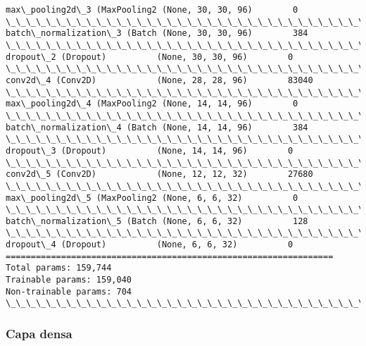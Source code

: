 \documentclass[11pt]{uc3mpracticas}
\begin{document}
\begin{Verbatim}[commandchars=\\\{\}]
max\_pooling2d\_3 (MaxPooling2 (None, 30, 30, 96)        0
\_\_\_\_\_\_\_\_\_\_\_\_\_\_\_\_\_\_\_\_\_\_\_\_\_\_\_\_\_\_\_\_\_\_\_\_\_\_\_\_\_\_\_\_\_\_\_\_\_\_\_\_\_\_\_\_\_\_\_\_\_\_\_\_\_
batch\_normalization\_3 (Batch (None, 30, 30, 96)        384
\_\_\_\_\_\_\_\_\_\_\_\_\_\_\_\_\_\_\_\_\_\_\_\_\_\_\_\_\_\_\_\_\_\_\_\_\_\_\_\_\_\_\_\_\_\_\_\_\_\_\_\_\_\_\_\_\_\_\_\_\_\_\_\_\_
dropout\_2 (Dropout)          (None, 30, 30, 96)        0
\_\_\_\_\_\_\_\_\_\_\_\_\_\_\_\_\_\_\_\_\_\_\_\_\_\_\_\_\_\_\_\_\_\_\_\_\_\_\_\_\_\_\_\_\_\_\_\_\_\_\_\_\_\_\_\_\_\_\_\_\_\_\_\_\_
conv2d\_4 (Conv2D)            (None, 28, 28, 96)        83040
\_\_\_\_\_\_\_\_\_\_\_\_\_\_\_\_\_\_\_\_\_\_\_\_\_\_\_\_\_\_\_\_\_\_\_\_\_\_\_\_\_\_\_\_\_\_\_\_\_\_\_\_\_\_\_\_\_\_\_\_\_\_\_\_\_
max\_pooling2d\_4 (MaxPooling2 (None, 14, 14, 96)        0
\_\_\_\_\_\_\_\_\_\_\_\_\_\_\_\_\_\_\_\_\_\_\_\_\_\_\_\_\_\_\_\_\_\_\_\_\_\_\_\_\_\_\_\_\_\_\_\_\_\_\_\_\_\_\_\_\_\_\_\_\_\_\_\_\_
batch\_normalization\_4 (Batch (None, 14, 14, 96)        384
\_\_\_\_\_\_\_\_\_\_\_\_\_\_\_\_\_\_\_\_\_\_\_\_\_\_\_\_\_\_\_\_\_\_\_\_\_\_\_\_\_\_\_\_\_\_\_\_\_\_\_\_\_\_\_\_\_\_\_\_\_\_\_\_\_
dropout\_3 (Dropout)          (None, 14, 14, 96)        0
\_\_\_\_\_\_\_\_\_\_\_\_\_\_\_\_\_\_\_\_\_\_\_\_\_\_\_\_\_\_\_\_\_\_\_\_\_\_\_\_\_\_\_\_\_\_\_\_\_\_\_\_\_\_\_\_\_\_\_\_\_\_\_\_\_
conv2d\_5 (Conv2D)            (None, 12, 12, 32)        27680
\_\_\_\_\_\_\_\_\_\_\_\_\_\_\_\_\_\_\_\_\_\_\_\_\_\_\_\_\_\_\_\_\_\_\_\_\_\_\_\_\_\_\_\_\_\_\_\_\_\_\_\_\_\_\_\_\_\_\_\_\_\_\_\_\_
max\_pooling2d\_5 (MaxPooling2 (None, 6, 6, 32)          0
\_\_\_\_\_\_\_\_\_\_\_\_\_\_\_\_\_\_\_\_\_\_\_\_\_\_\_\_\_\_\_\_\_\_\_\_\_\_\_\_\_\_\_\_\_\_\_\_\_\_\_\_\_\_\_\_\_\_\_\_\_\_\_\_\_
batch\_normalization\_5 (Batch (None, 6, 6, 32)          128
\_\_\_\_\_\_\_\_\_\_\_\_\_\_\_\_\_\_\_\_\_\_\_\_\_\_\_\_\_\_\_\_\_\_\_\_\_\_\_\_\_\_\_\_\_\_\_\_\_\_\_\_\_\_\_\_\_\_\_\_\_\_\_\_\_
dropout\_4 (Dropout)          (None, 6, 6, 32)          0
=================================================================
Total params: 159,744
Trainable params: 159,040
Non-trainable params: 704
\_\_\_\_\_\_\_\_\_\_\_\_\_\_\_\_\_\_\_\_\_\_\_\_\_\_\_\_\_\_\_\_\_\_\_\_\_\_\_\_\_\_\_\_\_\_\_\_\_\_\_\_\_\_\_\_\_\_\_\_\_\_\_\_\_
    \end{Verbatim}

    \hypertarget{capa-densa}{%
\subsubsection{Capa densa}\label{capa-densa}}
\end{document}
